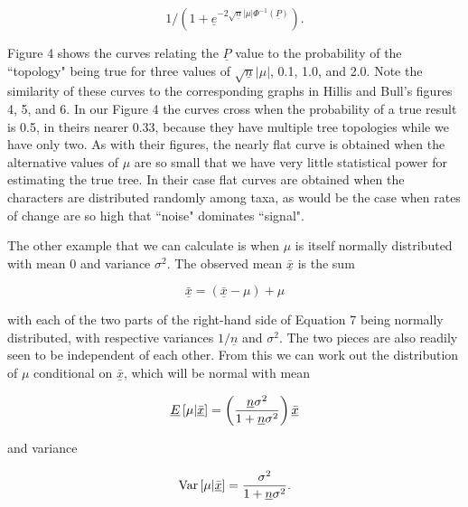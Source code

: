 {\begin{equation} %
1 \bigg/ \left(1 + \underline{e}^{-2\sqrt{\underline{n}}|\mu|\Phi^{-1}(\underline{P})}\right).
\end{equation}
\bigskip
\bigskip

\noindent
Figure 4 shows the curves relating the $\underline{P}$ value to the probability of the
``topology" being true for three values of $\sqrt{\underline{n}}|\mu|$, 0.1, 1.0, and
2.0.  Note the similarity of these curves to the corresponding graphs in
Hillis and Bull's figures 4, 5, and 6.  In our Figure 4 the curves cross
when the probability of a true result is 0.5, in theirs nearer 0.33,
because they have multiple tree topologies while we have only two.  As with
their figures, the nearly flat curve is obtained when the alternative
values of $\mu$ are so small that we have very little statistical power for
estimating the true tree.  In their case flat curves are obtained when the
characters are distributed randomly among taxa, as would be the case when
rates of change are so high that ``noise" dominates ``signal".

The other example that we can calculate is when $\mu$ is itself normally
distributed with mean 0 and variance $\sigma^2$.  The observed mean $\underline{\bar x}$
is the sum
\bigskip
\bigskip

\begin{equation} %
\underline{\bar x} =  \left(\underline{\bar x} - \mu\right)  + \mu
\end{equation}
\bigskip
\bigskip

\noindent
with each of the two parts of the right-hand side of Equation 7 being normally
distributed, with respective variances $1/\underline{n}$ and $\sigma^2$.  The two
pieces are also readily seen to be independent of each other.  From this
we can work out the distribution of $\mu$ conditional on $\underline{\bar x}$, which
will be normal with mean
\bigskip
\bigskip

\begin{equation} %
    \underline{E}\left[\mu | \underline{\bar x}\right]  =  \left({\underline{n}\sigma^2 \over 1 +
 \underline{n}\sigma^2}\right) \underline{\bar x}
\end{equation}
\bigskip
\bigskip

\noindent
and variance
\bigskip
\bigskip

\begin{equation} %
   {\rm Var} \left[ \mu | \underline{\bar x} \right]  =  {\sigma^2 \over 1 + \underline{n}\sigma^2}.
\end{equation}
\bigskip
\bigskip

}
